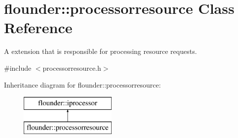 \hypertarget{classflounder_1_1processorresource}{}\section{flounder\+:\+:processorresource Class Reference}
\label{classflounder_1_1processorresource}


A extension that is responsible for processing resource requests.  




{\ttfamily \#include $<$processorresource.\+h$>$}

Inheritance diagram for flounder\+:\+:processorresource\+:\begin{figure}[H]
\begin{center}
\leavevmode
\includegraphics[height=2.000000cm]{classflounder_1_1processorresource}
\end{center}
\end{figure}
